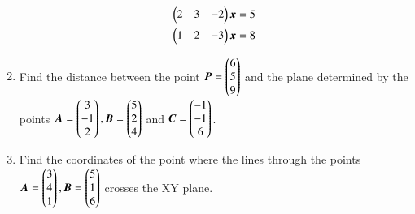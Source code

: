 \begin{enumerate}[label=\arabic*.,ref=\thesubsection.\theenumi]
\begin{align}
\begin{pmatrix}2 & 3 & -2\end{pmatrix}\bm{x}&=5
\\
\begin{pmatrix}1 & 2 & -3\end{pmatrix}\bm{x}&=8
\end{align}
%
\item Find the distance between the point $\bm{P}=\begin{pmatrix}6\\5\\9\end{pmatrix}$ and the plane determined by the points $\bm{A}=\begin{pmatrix}3\\-1\\2\end{pmatrix}, \bm{B}=\begin{pmatrix}5\\2\\4\end{pmatrix}$ and $\bm{C}=\begin{pmatrix}-1\\-1\\6\end{pmatrix}$.
\item Find the coordinates of the point where the lines through the points
$
\bm{A}=\begin{pmatrix}3\\4\\1\end{pmatrix}, 
\bm{B}=\begin{pmatrix}5\\1\\6\end{pmatrix}
$
crosses the XY plane.
%
\end{enumerate}
%
